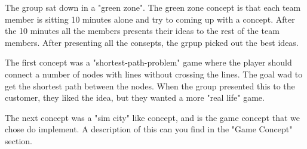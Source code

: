	The group sat down in a "green zone". The green zone concept is that each team member
	is sitting 10 minutes alone and try to coming up with a concept. After the 10 minutes
	all the members presents their ideas to the rest of the team members.
	After presenting all the consepts, the grpup picked out the best ideas. 

	The first concept was a "shortest-path-problem" game where the player should
	connect a number of nodes with lines without crossing the lines. The goal 
	wad to get the shortest path between the nodes. When the group presented this
	to the customer, they liked the idea, but they wanted a more "real life" game.

	The next concept was a "sim city" like concept, and is the game concept that
	we chose do implement. A description of this can you find in the "Game Concept"
	section. 

